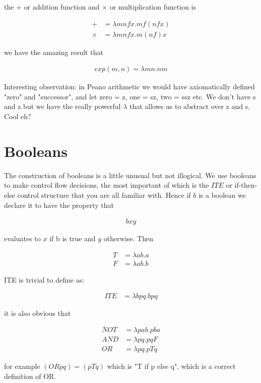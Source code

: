 \documentclass{article}
\begin{document}
the $+$ or addition function and $\times$ or multiplication function is 

\begin{align}
+ &= \lambda mnfx.mf(nfx) \\
\times &= \lambda mnfx. m(nf)x
\end{align}

we have the amazing result that

\begin{align}
exp(m,n) = \lambda mn. nm
\end{align}

Interesting observation: in Peano arithmetic we would have axiomatically defined "zero" and "successor", and let zero = z, one = sz, two = ssz etc. We don't have s and z but we have the really powerful $\lambda$ that allows us to abstract over z and s. Cool eh?

\section{Booleans}

The construction of booleans is a little unusual but not illogical. We use booleans to make control flow decisions, the most important of which is the $ITE$ or if-then-else control structure that you are all familiar with. Hence if $b$ is a boolean we declare it to have the property that

\begin{align}
b x y
\end{align}

evaluates to $x$ if b is true and $y$ otherwise. Then

\begin{align}
  T &= \lambda ab.a \\
  F &= \lambda ab.b
\end{align}

ITE is trivial to define as:

\begin{align}
ITE &= \lambda bpq.bpq
\end{align}

it is also obvious that

\begin{align}
NOT   &= \lambda pab. pba\\
AND   &= \lambda pq. pqF \\
OR    &= \lambda pq. pTq
\end{align}

for example $(OR p q) = (p T q)$ which is "T if p else q", which is a correct definition of OR.
\end{document}
